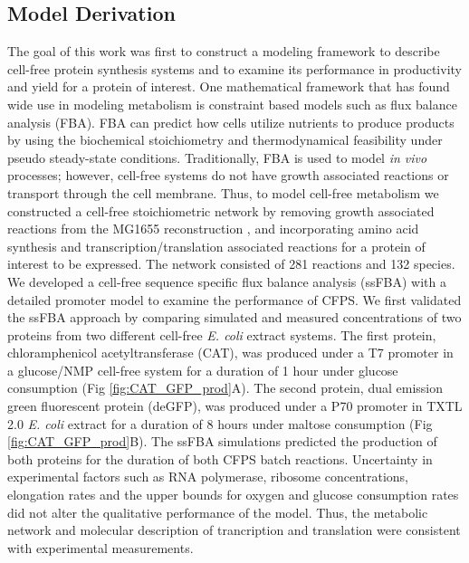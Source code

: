 \documentclass[journal=asbcd6,manuscript=article]{achemso}
\begin{document}
\subsection{Model Derivation}
The goal of this work was first to construct a modeling framework to describe cell-free protein synthesis systems and to examine its performance in productivity and yield for a protein of interest.
One mathematical framework that has found wide use in modeling metabolism is constraint based models such as flux balance analysis (FBA).
FBA can predict how cells utilize nutrients to produce products by using the biochemical stoichiometry and thermodynamical feasibility under pseudo steady-state conditions.
Traditionally, FBA is used to model \textit{in vivo} processes; however, cell-free systems do not have growth associated reactions or transport through the cell membrane.
Thus, to model cell-free metabolism we constructed a cell-free stoichiometric network by removing growth associated reactions from the MG1655 reconstruction \cite{Feist:2007aa}, and incorporating amino acid synthesis and transcription/translation associated reactions \cite{Allen:2003aa} for a protein of interest to be expressed.
The network consisted of 281 reactions and 132 species.
We developed a cell-free sequence specific flux balance analysis (ssFBA) with a detailed promoter model \cite{Moon:2012aa} to examine the performance of CFPS.
We first validated the ssFBA approach by comparing simulated and measured concentrations of two proteins from two different cell-free \textit{E. coli} extract systems.
The first protein, chloramphenicol acetyltransferase (CAT), was produced under a T7 promoter in a glucose/NMP cell-free system \cite{2005_calhoun_BiotechnologyProgress} for a duration of 1 hour under glucose consumption (Fig \ref{fig:CAT_GFP_prod}A).
The second protein, dual emission green fluorescent protein (deGFP), was produced under a P70 promoter in TXTL 2.0 \textit{E. coli} extract for a duration of 8 hours under maltose consumption (Fig \ref{fig:CAT_GFP_prod}B).
The ssFBA simulations predicted the production of both proteins for the duration of both CFPS batch reactions.
Uncertainty in experimental factors such as RNA polymerase, ribosome concentrations, elongation rates and the upper bounds for oxygen and glucose consumption rates did not alter the qualitative performance of the model.
Thus, the metabolic network and molecular description of trancription and translation were consistent with experimental measurements.
\end{document}
